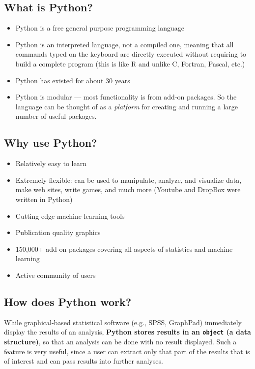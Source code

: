 \documentclass[
]{book}
\providecommand{\tightlist}{%
  \setlength{\itemsep}{0pt}\setlength{\parskip}{0pt}}
\begin{document}
\hypertarget{what-is-python}{%
\subsection{What is Python?}\label{what-is-python}}

\begin{itemize}
\tightlist
\item
  Python is a free general purpose programming language
\item
  Python is an interpreted language, not a compiled one, meaning that all commands
  typed on the keyboard are directly executed without requiring to build a complete
  program (this is like R and unlike C, Fortran, Pascal, etc.)
\item
  Python has existed for about 30 years
\item
  Python is modular --- most functionality is from add-on packages. So the language can
  be thought of as a \emph{platform} for creating and running a large number of useful packages.
\end{itemize}

\hypertarget{why-use-python}{%
\subsection{Why use Python?}\label{why-use-python}}

\begin{itemize}
\tightlist
\item
  Relatively easy to learn
\item
  Extremely flexible: can be used to manipulate, analyze, and visualize data,
  make web sites, write games, and much more (Youtube and DropBox were written in Python)
\item
  Cutting edge machine learning tools
\item
  Publication quality graphics
\item
  150,000+ add on packages covering all aspects of statistics and machine learning
\item
  Active community of users
\end{itemize}

\hypertarget{how-does-python-work}{%
\subsection{How does Python work?}\label{how-does-python-work}}

While graphical-based statistical software (e.g., SPSS, GraphPad) immediately display
the results of an analysis, \textbf{Python stores results in an \texttt{object} (a data structure)},
so that an analysis can be done with no result displayed. Such a feature is very
useful, since a user can extract only that part of the results that is of interest
and can pass results into further analyses.
\end{document}
